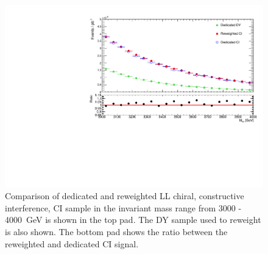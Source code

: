 \begin{figure}[h]
    \centering
    \includegraphics[width=\mediumfigwidth]{figures/analysis/datamc/sigmodel/CICompare.pdf}
    \caption[Validation of signal reweighting]{Comparison of dedicated and reweighted LL chiral, constructive interference, CI sample in the invariant mass range from 3000 - \SI{4000}{\giga\electronvolt} is shown in the top pad. The DY sample used to reweight is also shown. The bottom pad shows the ratio between the reweighted and dedicated CI signal.}
    \label{fig:datamc:sigValidate}
\end{figure}

